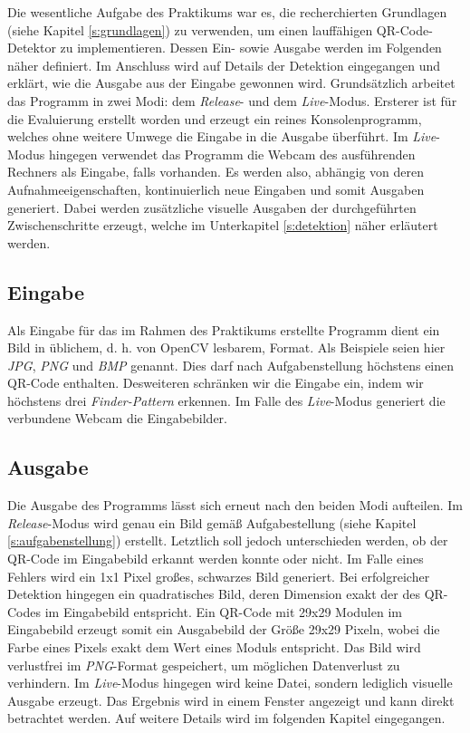 \documentclass[a4paper, oneside, 12pt]{article}
\begin{document}
Die wesentliche Aufgabe des Praktikums war es, die recherchierten Grundlagen (siehe Kapitel \ref{s:grundlagen}) zu verwenden, um einen lauffähigen QR-Code-Detektor zu implementieren. Dessen Ein- sowie Ausgabe werden im Folgenden näher definiert.
Im Anschluss wird auf Details der Detektion eingegangen und erklärt, wie die Ausgabe aus der Eingabe gewonnen wird.
Grundsätzlich arbeitet das Programm in zwei Modi: dem \emph{Release}- und dem \emph{Live}-Modus.
Ersterer ist für die Evaluierung erstellt worden und erzeugt ein reines Konsolenprogramm, welches ohne weitere Umwege die Eingabe in die Ausgabe überführt.
Im \emph{Live}-Modus hingegen verwendet das Programm die Webcam des ausführenden Rechners als Eingabe, falls vorhanden. Es werden also, abhängig von deren Aufnahmeeigenschaften, kontinuierlich neue Eingaben und somit Ausgaben generiert. Dabei werden zusätzliche visuelle Ausgaben der durchgeführten Zwischenschritte erzeugt, welche im Unterkapitel \ref{s:detektion} näher erläutert werden.

\subsection{Eingabe}
\label{s:eingabe}

Als Eingabe für das im Rahmen des Praktikums erstellte Programm dient ein Bild in üblichem, d. h. von OpenCV lesbarem, Format. Als Beispiele seien hier \emph{JPG}, \emph{PNG} und \emph{BMP} genannt.
Dies darf nach Aufgabenstellung höchstens einen QR-Code enthalten.
Desweiteren schränken wir die Eingabe ein, indem wir höchstens drei \emph{Finder-Pattern} erkennen.
Im Falle des \emph{Live}-Modus generiert die verbundene Webcam die Eingabebilder.

\subsection{Ausgabe}
\label{s:ausgabe}

Die Ausgabe des Programms lässt sich erneut nach den beiden Modi aufteilen.
Im \emph{Release}-Modus wird genau ein Bild gemäß Aufgabestellung (siehe Kapitel \ref{s:aufgabenstellung}) erstellt. Letztlich soll jedoch unterschieden werden, ob der QR-Code im Eingabebild erkannt werden konnte oder nicht. Im Falle eines Fehlers wird ein 1x1 Pixel großes, schwarzes Bild generiert. Bei erfolgreicher Detektion hingegen ein quadratisches Bild, deren Dimension exakt der des QR-Codes im Eingabebild entspricht.
Ein QR-Code mit 29x29 Modulen im Eingabebild erzeugt somit ein Ausgabebild der Größe 29x29 Pixeln, wobei die Farbe eines Pixels exakt dem Wert eines Moduls entspricht.
Das Bild wird verlustfrei im \emph{PNG}-Format gespeichert, um möglichen Datenverlust zu verhindern.
Im \emph{Live}-Modus hingegen wird keine Datei, sondern lediglich visuelle Ausgabe erzeugt. Das Ergebnis wird in einem Fenster angezeigt und kann direkt betrachtet werden. Auf weitere Details wird im folgenden Kapitel eingegangen.
\end{document}
